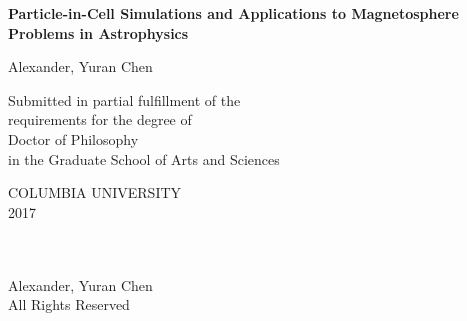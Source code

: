 
\newcommand{\thesistitle}{Particle-in-Cell Simulations and Applications
 \protect\linebreak[1]to Magnetosphere Problems in Astrophysics}
\newcommand{\thesisauthor}{Alexander, Yuran Chen}
\newcommand{\thesisyear}{2017}


$\phantom{a}$

$\phantom{a}$

$\phantom{a}$

\begin{center}

{\LARGE \bf \thesistitle}

\vskip1.0in

{\Large  \thesisauthor} \vskip0.5in

\vskip1.5in

\large
Submitted in partial fulfillment of the \\
requirements for the degree of \\
Doctor of Philosophy \\
in the Graduate School of Arts and Sciences \\

\vskip0.5in

COLUMBIA UNIVERSITY \\
\thesisyear \\

\end{center}
\clearpage

\begin{center}
\ \\
\vskip6.5in
\textcopyright \thesisyear \\[3mm]
\thesisauthor \\
All Rights Reserved
\end{center}
\clearpage
